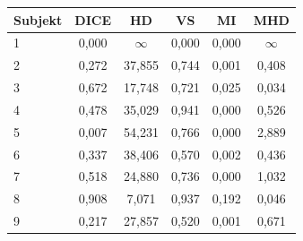 \begin{tabular}{l c c c c c}
 \hline
Subjekt & DICE & HD & VS & MI & MHD \\ \hline
1 & 0,000 & $\infty$ & 0,000 & 0,000 & $\infty$ \\
2 & 0,272 & 37,855 & 0,744 & 0,001 & 0,408 \\
3 & 0,672 & 17,748 & 0,721 & 0,025 & 0,034 \\
4 & 0,478 & 35,029 & 0,941 & 0,000 & 0,526 \\
5 & 0,007 & 54,231 & 0,766 & 0,000 & 2,889 \\
6 & 0,337 & 38,406 & 0,570 & 0,002 & 0,436 \\
7 & 0,518 & 24,880 & 0,736 & 0,000 & 1,032 \\
8 & 0,908 & 7,071 & 0,937 & 0,192 & 0,046 \\
9 & 0,217 & 27,857 & 0,520 & 0,001 & 0,671 \\
\hline 
 \end{tabular}
